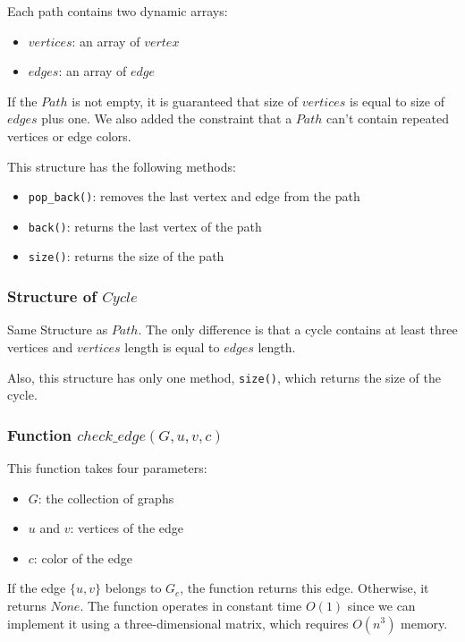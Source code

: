 Each path contains two dynamic arrays:

\begin{itemize}
    \item $vertices$: an array of $vertex$
    \item $edges$: an array of $edge$
\end{itemize}

If the $Path$ is not empty, it is guaranteed that size of 
$vertices$ is equal to size of $edges$ plus one. We 
also added the constraint that a $Path$ can't contain repeated 
vertices or edge colors.

This structure has the following methods:

\begin{itemize}
    \item \texttt{pop\_back()}: removes the last vertex and edge from the path
    \item \texttt{back()}: returns the last vertex of the path
    \item \texttt{size()}: returns the size of the path
\end{itemize}

\subsubsection{Structure of $Cycle$}

Same Structure as $Path$. The only difference is that a cycle contains
at least three vertices and $vertices$ length is equal to $edges$ length.

Also, this structure has only one method, \texttt{size()}, which returns the size of the cycle.

\subsubsection{Function $check\_edge(G, u, v, c)$}

This function takes four parameters:

\begin{itemize}
    \item $G$: the collection of graphs
    \item $u$ and $v$: vertices of the edge
    \item $c$: color of the edge
\end{itemize}

If the edge $\{u, v\}$ belongs to $G_c$, the function returns this edge. Otherwise, it returns $None$. The function operates in constant time $O(1)$ since we can implement it using a three-dimensional matrix, which requires $O(n^3)$ memory.

